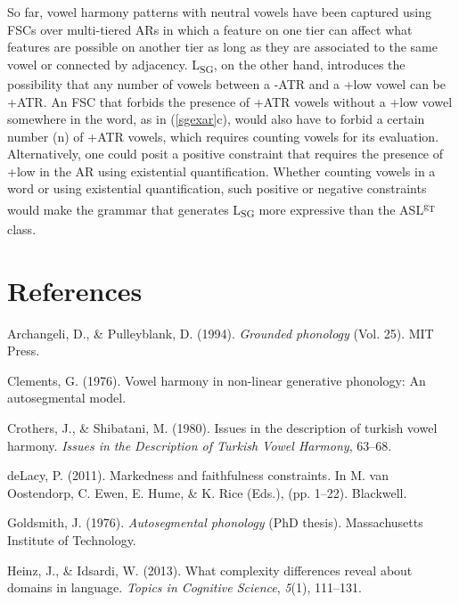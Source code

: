 \documentclass[,doc,floatsintext]{apa6}
\theoremstyle{definition}
\theoremstyle{definition}
\theoremstyle{definition}
\theoremstyle{remark}
\begin{document}
So far, vowel harmony patterns with neutral vowels have been captured
using FSCs over multi-tiered ARs in which a feature on one tier can
affect what features are possible on another tier as long as they are
associated to the same vowel or connected by adjacency.
L\textsubscript{SG}, on the other hand, introduces the possibility that
any number of vowels between a -ATR and a +low vowel can be +ATR. An FSC
that forbids the presence of +ATR vowels without a +low vowel somewhere
in the word, as in (\ref{sgexar}c), would also have to forbid a certain
number (n) of +ATR vowels, which requires counting vowels for its
evaluation. Alternatively, one could posit a positive constraint that
requires the presence of +low in the AR using existential
quantification. Whether counting vowels in a word or using existential
quantification, such positive or negative constraints would make the
grammar that generates L\textsubscript{SG} more expressive than the
ASL\textsuperscript{g\textsubscript{T}} class.

\newpage

\section{References}\label{references}

\setlength{\parindent}{-0.5in} \setlength{\leftskip}{0.5in}

\hypertarget{refs}{}
\hypertarget{ref-archangelipulleyblank1994}{}
Archangeli, D., \& Pulleyblank, D. (1994). \emph{Grounded phonology}
(Vol. 25). MIT Press.

\hypertarget{ref-Clements1976}{}
Clements, G. (1976). Vowel harmony in non-linear generative phonology:
An autosegmental model.

\hypertarget{ref-crothersshibatani1980}{}
Crothers, J., \& Shibatani, M. (1980). Issues in the description of
turkish vowel harmony. \emph{Issues in the Description of Turkish Vowel
Harmony}, 63--68.

\hypertarget{ref-delacy2011}{}
deLacy, P. (2011). Markedness and faithfulness constraints. In M. van
Oostendorp, C. Ewen, E. Hume, \& K. Rice (Eds.), (pp. 1--22). Blackwell.

\hypertarget{ref-Goldsmith1976}{}
Goldsmith, J. (1976). \emph{Autosegmental phonology} (PhD thesis).
Massachusetts Institute of Technology.

\hypertarget{ref-heinzidsardi2013}{}
Heinz, J., \& Idsardi, W. (2013). What complexity differences reveal
about domains in language. \emph{Topics in Cognitive Science},
\emph{5}(1), 111--131.
\end{document}
